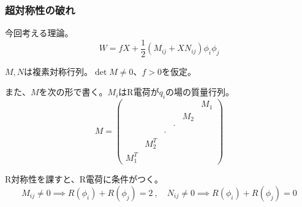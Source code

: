 \documentclass[
  unicode,a4paper,9pt,
  xcolor = {dvipsnames,svgnames},
  hyperref ={colorlinks=true,citecolor=Navy,linkcolor=NavyBlue,urlcolor=purple},
  ja=standard,lualatex
]{beamer}
\begin{document}
\begin{frame}
  \frametitle{超対称性の破れ}

  今回考える理論。
  \begin{equation}
    W
    =
    fX
    +
    \frac{1}{2}(M_{ij}+XN_{ij})\phi_{i}\phi_{j}
    \nonumber
  \end{equation}

  $M,N$は複素対称行列。$\det M\neq 0$、$f> 0$を仮定。

  また、$M$を次の形で書く。$M_{i}$はR電荷が$q_{i}$の場の質量行列。
  \begin{equation}
    M
    =
    \begin{pmatrix}
                &           &       &       &       & M_{1} \\
                &           &       &       & M_{2} &       \\
                &           &       & \cdot &       &       \\
                &           & \cdot &       &       &       \\
                & M_{2}^{T} &       &       &       &       \\
      M_{1}^{T} &           &       &       &       &
    \end{pmatrix}
    \nonumber
  \end{equation}

  R対称性を課すと、R電荷に条件がつく。
  \begin{equation}
    M_{ij}\neq 0
    \implies
    R(\phi_{i})+R(\phi_{j})=2
    \ ,\quad
    N_{ij}\neq 0
    \implies
    R(\phi_{i})+R(\phi_{j})=0
    \nonumber
  \end{equation}

\end{frame}
\end{document}

